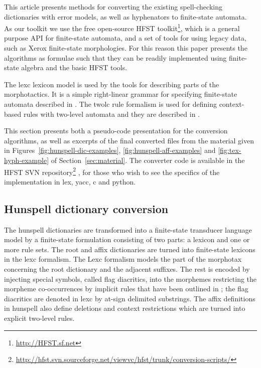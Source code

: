 \documentclass[postprint]{flammie}
\begin{document}
This article presents methods for converting the existing spell-checking
dictionaries with error models, as well as hyphenators to finite-state
automata. As our toolkit we use the free open-source HFST
toolkit\footnote{\url{http://HFST.sf.net}}, which is a general purpose API for
finite-state automata, and a set of tools for using legacy data, such as Xerox
finite-state morphologies. For this reason this paper presents the algorithms
as formulae such that they can be readily implemented using finite-state
algebra and the basic HFST tools.

The lexc lexicon model is used by the tools for describing parts of the
morphotactics. It is a simple right-linear grammar for specifying finite-state
automata described in \cite{beesley2003finitestate,linden2009hfst}. The twolc rule
formalism is used for defining context-based rules with two-level automata and
they are described in \cite{koskenniemi1983twolevel,linden2009hfst}.

This section presents both a pseudo-code presentation for the conversion
algorithms, as well as excerpts of the final converted files from the material
given in Figures~\ref{fig:hunspell-dic-examples},
\ref{fig:hunspell-aff-examples} and \ref{fig:tex-hyph-example} of
Section~\ref{sec:material}.  The converter code is available in the HFST SVN
repository\footnote{\url{http://hfst.svn.sourceforge.net/viewvc/hfst/trunk/conversion-scripts/}}
, for those who wish to see the specifics of the implementation in
lex, yacc, c and python.

\subsection{Hunspell dictionary conversion}

The hunspell dictionaries are transformed into a finite-state transducer
language model by a finite-state formulation consisting of two parts: a lexicon
and one or more rule sets. The root and affix dictionaries are turned into
finite-state lexicons in the lexc formalism. The Lexc formalism models the part
of the morphotax concerning the root dictionary and the adjacent suffixes. The
rest is encoded by injecting special symbols, called flag diacritics, into the
morphemes restricting the morpheme co-occurrences by implicit rules that have
been outlined in \cite{beesley1998constraining}; the flag diacritics are denoted in lexc
by at-sign delimited substrings. The affix definitions in hunspell also define
deletions and context restrictions which are turned into explicit two-level
rules.
\end{document}
